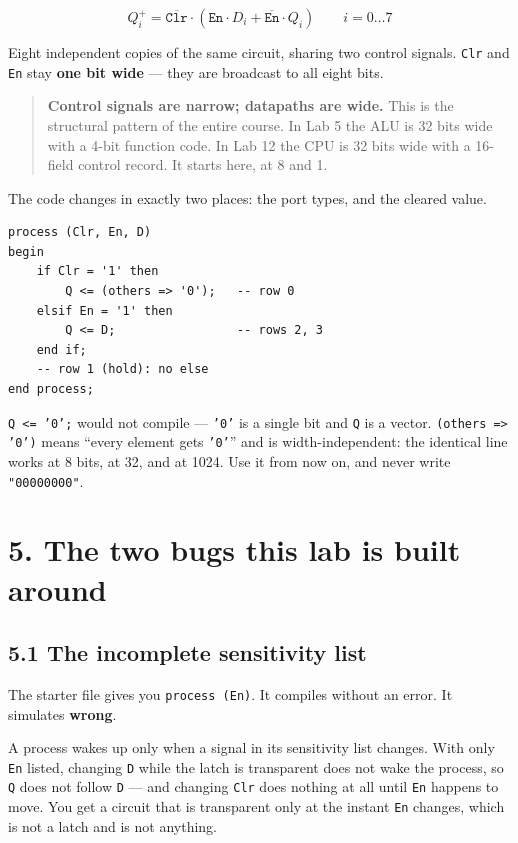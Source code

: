 \documentclass[11pt]{article}
\newcommand{\code}[1]{\texttt{#1}}
\begin{document}
\[
Q_i^{+} = \overline{\code{Clr}} \cdot \left( \code{En} \cdot D_i + \overline{\code{En}} \cdot Q_i \right)
\qquad i = 0 \ldots 7
\]

Eight independent copies of the same circuit, sharing two control signals. \code{Clr}
and \code{En} stay \textbf{one bit wide} --- they are broadcast to all eight bits.

\begin{quote}
\textbf{Control signals are narrow; datapaths are wide.} This is the structural
pattern of the entire course. In Lab 5 the ALU is 32 bits wide with a 4-bit function
code. In Lab 12 the CPU is 32 bits wide with a 16-field control record. It starts
here, at 8 and 1.
\end{quote}

The code changes in exactly two places: the port types, and the cleared value.

\begin{lstlisting}
process (Clr, En, D)
begin
    if Clr = '1' then
        Q <= (others => '0');   -- row 0
    elsif En = '1' then
        Q <= D;                 -- rows 2, 3
    end if;
    -- row 1 (hold): no else
end process;
\end{lstlisting}

\code{Q <= '0';} would not compile --- \code{'0'} is a single bit and \code{Q} is a
vector. \code{(others => '0')} means ``every element gets \code{'0'}'' and is
width-independent: the identical line works at 8 bits, at 32, and at 1024. Use it
from now on, and never write \code{"00000000"}.

\section*{5. The two bugs this lab is built around}

\subsection*{5.1 The incomplete sensitivity list}

The starter file gives you \code{process (En)}. It compiles without an error. It
simulates \textbf{wrong}.

A process wakes up only when a signal in its sensitivity list changes. With only
\code{En} listed, changing \code{D} while the latch is transparent does not wake the
process, so \code{Q} does not follow \code{D} --- and changing \code{Clr} does
nothing at all until \code{En} happens to move. You get a circuit that is
transparent only at the instant \code{En} changes, which is not a latch and is not
anything.
\end{document}
